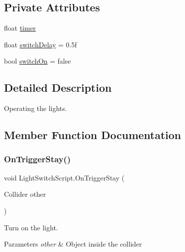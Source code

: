 \subsection*{Private Attributes}
\begin{DoxyCompactItemize}
\item 
float \mbox{\hyperlink{class_light_switch_script_abf98d3d80b24706721970aaed64ec0ea}{timer}}
\item 
float \mbox{\hyperlink{class_light_switch_script_a2924fa9a2279417a792949e92fb8d3a8}{switch\+Delay}} = 0.\+5f
\item 
bool \mbox{\hyperlink{class_light_switch_script_a913b341df9242c9626813c69942ab4e2}{switch\+On}} = false
\end{DoxyCompactItemize}


\subsection{Detailed Description}
Operating the lights. 

\subsection{Member Function Documentation}
\mbox{\label{class_light_switch_script_a3a8abb43406b14adfd89d68b5bac6c79}} 
\subsubsection{\texorpdfstring{OnTriggerStay()}{OnTriggerStay()}}
{\footnotesize\ttfamily void Light\+Switch\+Script.\+On\+Trigger\+Stay (\begin{DoxyParamCaption}\item[{Collider}]{other }\end{DoxyParamCaption})\hspace{0.3cm}{\ttfamily [private]}}



Turn on the light. 


\begin{DoxyParams}{Parameters}
{\em other} & Object inside the collider \\
\hline
\end{DoxyParams}
\mbox{\label{class_light_switch_script_a1c16d87199a05e70510aff7742bd1008}} 
